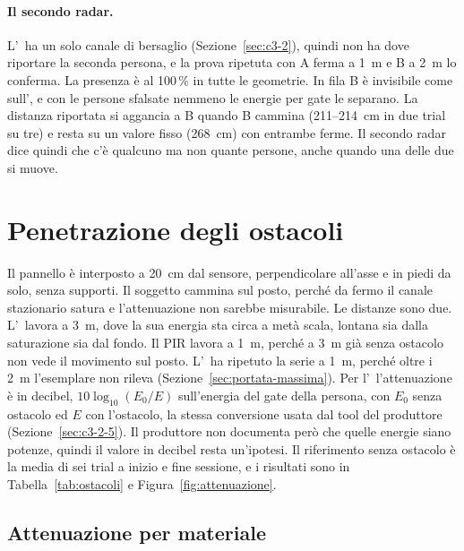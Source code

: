 \paragraph{Il secondo radar.} L'\ldc\ ha un solo canale di bersaglio (Sezione~\ref{sec:c3-2}), quindi non ha dove riportare la seconda persona, e la prova ripetuta con A ferma a 1~m e B a 2~m lo conferma. La presenza è al 100\,\% in tutte le geometrie. In fila B è invisibile come sull'\ldb, e con le persone sfalsate nemmeno le energie per gate le separano. La distanza riportata si aggancia a B quando B cammina (211--214~cm in due trial su tre) e resta su un valore fisso (268~cm) con entrambe ferme. Il secondo radar dice quindi che c'è qualcuno ma non quante persone, anche quando una delle due si muove.

\section{Penetrazione degli ostacoli}
\label{sec:ostacoli}

Il pannello è interposto a 20~cm dal sensore, perpendicolare all'asse e in piedi da solo, senza supporti. Il soggetto cammina sul posto, perché da fermo il canale stazionario satura e l'attenuazione non sarebbe misurabile. Le distanze sono due. L'\ldb\ lavora a 3~m, dove la sua energia sta circa a metà scala, lontana sia dalla saturazione sia dal fondo. Il PIR lavora a 1~m, perché a 3~m già senza ostacolo non vede il movimento sul posto. L'\ldc\ ha ripetuto la serie a 1~m, perché oltre i 2~m l'esemplare non rileva (Sezione~\ref{sec:portata-massima}). Per l'\ldc\ l'attenuazione è in decibel, $10\log_{10}(E_0/E)$ sull'energia del gate della persona, con $E_0$ senza ostacolo ed $E$ con l'ostacolo, la stessa conversione usata dal tool del produttore (Sezione~\ref{sec:c3-2-5}). Il produttore non documenta però che quelle energie siano potenze, quindi il valore in decibel resta un'ipotesi. Il riferimento senza ostacolo è la media di sei trial a inizio e fine sessione, e i risultati sono in Tabella~\ref{tab:ostacoli} e Figura~\ref{fig:attenuazione}.

\subsection{Attenuazione per materiale}
\label{sec:ostacoli-materiali}
\label{sec:ld2420-attenuazione}

